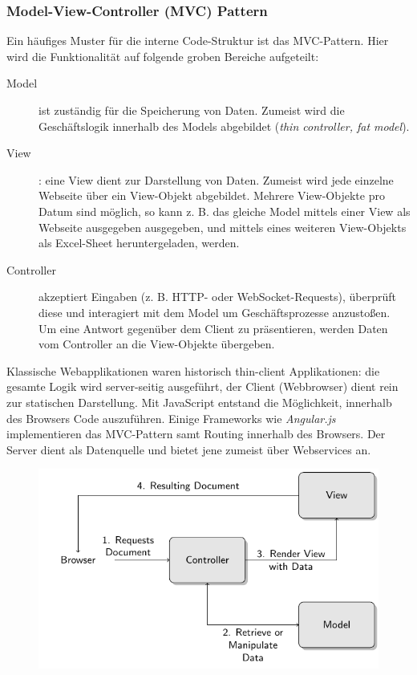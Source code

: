 \subsubsection{Model-View-Controller (MVC) Pattern}

Ein häufiges Muster für die interne Code-Struktur ist das MVC-Pattern. Hier wird die Funktionalität auf folgende groben Bereiche aufgeteilt:

\begin{description}
	\item[Model] ist zuständig für die Speicherung von Daten. Zumeist wird die Geschäftslogik innerhalb des Models abgebildet (\textit{thin controller, fat model}).
	\item[View]: eine View dient zur Darstellung von Daten. Zumeist wird jede einzelne Webseite über ein View-Objekt abgebildet. Mehrere View-Objekte pro Datum sind möglich, so kann z. B. das gleiche Model mittels einer View als Webseite ausgegeben ausgegeben, und mittels eines weiteren View-Objekts als Excel-Sheet heruntergeladen, werden.
	\item[Controller] akzeptiert Eingaben (z. B. HTTP- oder WebSocket-Requests), überprüft diese und interagiert mit dem Model um Geschäftsprozesse anzustoßen. Um eine Antwort gegenüber dem Client zu präsentieren, werden Daten vom Controller an die View-Objekte übergeben.
\end{description}

Klassische Webapplikationen waren historisch thin-client Applikationen: die gesamte Logik wird server-seitig ausgeführt, der Client (Webbrowser) dient rein zur statischen Darstellung. Mit JavaScript entstand die Möglichkeit, innerhalb des Browsers Code auszuführen. Einige Frameworks wie \textit{Angular.js} implementieren das MVC-Pattern samt Routing innerhalb des Browsers. Der Server dient als Datenquelle und bietet jene zumeist über Webservices an.

\begin{figure}[h!]
	\includegraphics[width=\textwidth]{graphs/mvc.pdf}
	\centering
\end{figure}

